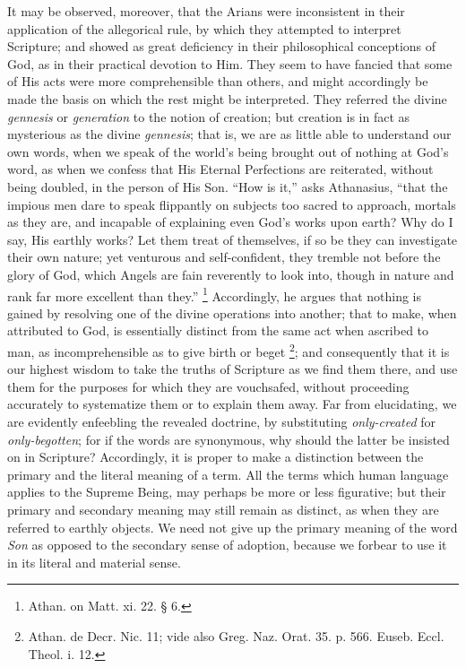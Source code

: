 It may be observed, moreover, that the Arians were inconsistent in
their application of the allegorical rule, by which they attempted to
interpret Scripture; and showed as great deficiency in their
philosophical conceptions of God, as in their practical devotion to
Him. They seem to have fancied that some of His acts were more
comprehensible than others, and might accordingly be made the basis on
which the rest might be interpreted. They referred the divine \emph{gennesis}
or \emph{generation} to the notion of creation; but creation is in
fact as mysterious as the divine \emph{gennesis}; that is, we are as
little able to understand our own words, when we speak of the
world's being brought out of nothing at God's word, as when we confess
that His Eternal Perfections are reiterated, without being doubled, in
the person of His Son. ``How is it,'' asks Athanasius,
``that the impious men dare to speak flippantly on subjects too
sacred to approach, mortals as they are, and incapable of explaining
even God's works upon earth? Why do I say, His earthly works? Let them
treat of themselves, if so be they can investigate their own nature;
yet venturous and self-confident, they tremble not before the glory of
God, which Angels are fain reverently to look into, though in nature
and rank far more excellent than they.'' \footnote{Athan. on Matt. xi. 22. § 6.} Accordingly, he argues that nothing is gained by resolving one
of the divine operations into another; that to make, when attributed
to God, is essentially distinct from the same act when ascribed to
man, as incomprehensible as to give birth or beget \footnote{Athan. de Decr. Nic. 11; vide also Greg.
Naz. Orat. 35. p. 566. Euseb. Eccl. Theol. i. 12.}; and consequently that it is our highest wisdom to take the
truths of Scripture as we find them there, and use them for the
purposes for which they are vouchsafed, without proceeding accurately
to systematize them or to explain them away. Far from elucidating, we
are evidently enfeebling the revealed doctrine, by substituting \emph{only-created}
for \emph{only-begotten}; for if the words are synonymous, why should
the latter be insisted on in Scripture? Accordingly, it is proper to
make a distinction between the primary and the literal meaning of a
term. All the terms which human language applies to the Supreme Being,
may perhaps be more or less figurative; but their primary and
secondary meaning may still remain as distinct, as when they are
referred to earthly objects. We need not give up the primary meaning
of the word \emph{Son} as opposed to the secondary sense of adoption,
because we forbear to use it in its literal and material sense.

